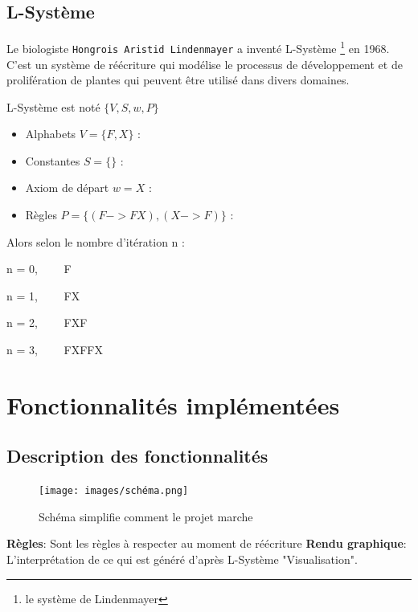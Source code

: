     \subsection{L-Système}
\begin{onehalfspace}
    
           \Large{Le biologiste \texttt{Hongrois Aristid Lindenmayer} a inventé L-Système \footnote{le système de Lindenmayer} en 1968. C'est un système de réécriture qui modélise le processus de développement et de prolifération de plantes qui peuvent être utilisé dans divers domaines.}
           
          \Large{L-Système est noté $\{V,S,w,P\}$ }
       \begin{itemize}
           \item Alphabets $V=\{F,X\}$ : 
           \item Constantes $S=\{\}$ : 
           \item Axiom de départ $w=X$ :
           \item Règles $P=\{(F->FX), (X->F)\}$ :
       \end{itemize}
       Alors selon le nombre d'itération n :
       
       \Large{n = 0, \ \ \ \ F}
       
       \Large{n = 1, \ \ \ \ FX}
       
       \Large{n = 2, \ \ \ \ FXF} 
       
       \Large{n = 3, \ \ \ \ FXFFX} 

    \end{onehalfspace}
    

\newpage
    
    
\section{Fonctionnalités implémentées}
\subsection{Description des fonctionnalités}

       
    \begin{figure}[h]
      \begin{center}
         \texttt{[image: images/schéma.png]}
      \end{center}
        \caption{Schéma simplifie comment le projet marche }
        \label{fig:schema}
    \end{figure}
    \Large{}    
\begin{onehalfspace}

\Large{\textbf{Règles}: Sont les règles à respecter au moment de réécriture}
\Large{\textbf{Rendu graphique}: L'interprétation de ce qui est généré d'après
L-Système "Visualisation".}

\end{onehalfspace}
     \newpage
    
